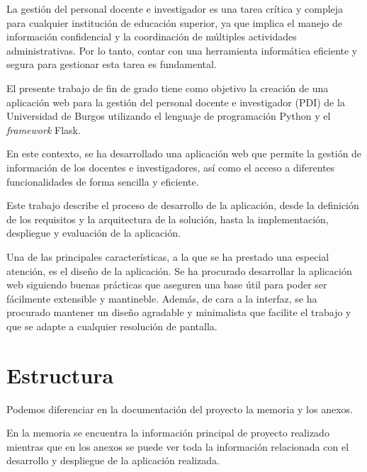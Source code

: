 
La gestión del personal docente e investigador es una tarea crítica y compleja para cualquier institución de educación superior, ya que implica el manejo de información confidencial y la coordinación de múltiples actividades administrativas. 
Por lo tanto, contar con una herramienta informática eficiente y segura para gestionar esta tarea es fundamental.

El presente trabajo de fin de grado tiene como objetivo la creación de una aplicación web para la gestión del personal docente e investigador (PDI) de la Universidad de Burgos utilizando el lenguaje de programación Python y el \textit{framework} Flask.

En este contexto, se ha desarrollado una aplicación web que permite la gestión de información de los docentes e investigadores, así como el acceso a diferentes funcionalidades de forma sencilla y eficiente. 

Este trabajo describe el proceso de desarrollo de la aplicación, desde la definición de los requisitos y la arquitectura de la solución, hasta la implementación, despliegue y evaluación de la aplicación. 

Una de las principales características, a la que se ha prestado una especial atención, es el diseño de la aplicación.
Se ha procurado desarrollar la aplicación web siguiendo buenas prácticas que aseguren una base útil para poder ser fácilmente extensible y mantineble.
Además, de cara a la interfaz, se ha procurado mantener un diseño agradable y minimalista que facilite el trabajo y que se adapte a cualquier resolución de pantalla.

\section{Estructura}
Podemos diferenciar en la documentación del proyecto la memoria y los anexos.

En la memoria se encuentra la información principal de proyecto realizado mientras que en los anexos se puede ver toda la información relacionada con el desarrollo y despliegue de la aplicación realizada.

